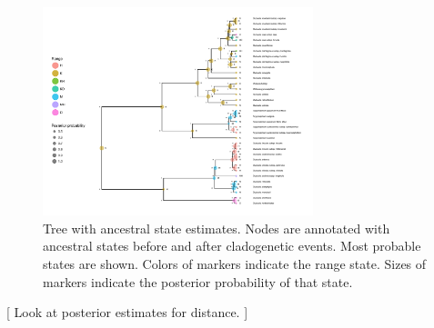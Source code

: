 \begin{figure}[!ht]
\centering
\includegraphics[width=0.7\textwidth]{figures/fig_epoch_RevGadgets_ase.pdf}
\caption{Tree with ancestral state estimates. Nodes are annotated with ancestral states before and after cladogenetic events. Most probable states are shown. Colors of markers indicate the range state. Sizes of markers indicate the posterior probability of that state. }
\label{fig:epoch_RevGadgets_ase}
\end{figure}

[ Look at posterior estimates for distance. ]

\newpage
